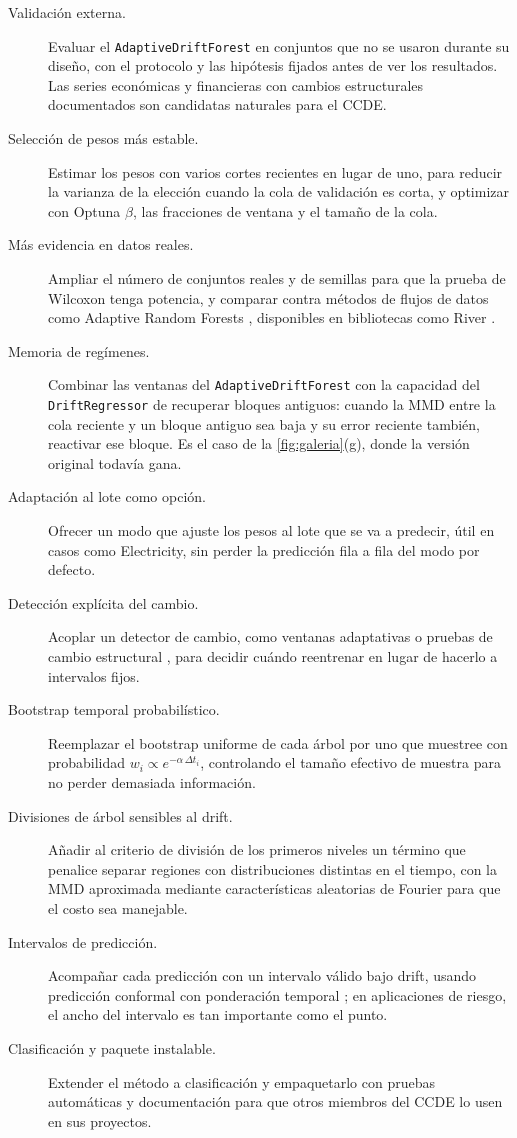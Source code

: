 \documentclass[11pt,a4paper]{article}
\begin{document}
\begin{description}
  \item[Validación externa.] Evaluar el \texttt{AdaptiveDriftForest} en conjuntos que no se usaron
  durante su diseño, con el protocolo y las hipótesis fijados antes de ver los resultados. Las series
  económicas y financieras con cambios estructurales documentados son candidatas naturales para el
  CCDE.
  \item[Selección de pesos más estable.] Estimar los pesos con varios cortes recientes en lugar de
  uno, para reducir la varianza de la elección cuando la cola de validación es corta, y optimizar con
  Optuna $\beta$, las fracciones de ventana y el tamaño de la cola.
  \item[Más evidencia en datos reales.] Ampliar el número de conjuntos reales y de semillas para que
  la prueba de Wilcoxon tenga potencia, y comparar contra métodos de flujos de datos como Adaptive
  Random Forests \parencite{gomes2017}, disponibles en bibliotecas como River
  \parencite{montiel2021}.
  \item[Memoria de regímenes.] Combinar las ventanas del \texttt{AdaptiveDriftForest} con la capacidad
  del \texttt{DriftRegressor} de recuperar bloques antiguos: cuando la MMD entre la cola reciente y un
  bloque antiguo sea baja y su error reciente también, reactivar ese bloque. Es el caso de la
  \cref{fig:galeria}(g), donde la versión original todavía gana.
  \item[Adaptación al lote como opción.] Ofrecer un modo que ajuste los pesos al lote que se va a
  predecir, útil en casos como Electricity, sin perder la predicción fila a fila del modo por
  defecto.
  \item[Detección explícita del cambio.] Acoplar un detector de cambio, como ventanas adaptativas
  \parencite{bifet2007} o pruebas de cambio estructural \parencite{baiperron1998}, para decidir
  cuándo reentrenar en lugar de hacerlo a intervalos fijos.
  \item[Bootstrap temporal probabilístico.] Reemplazar el bootstrap uniforme de cada árbol por uno
  que muestree con probabilidad $w_i \propto e^{-\alpha\,\Delta t_i}$, controlando el tamaño efectivo
  de muestra para no perder demasiada información.
  \item[Divisiones de árbol sensibles al drift.] Añadir al criterio de división de los primeros
  niveles un término que penalice separar regiones con distribuciones distintas en el tiempo, con la
  MMD aproximada mediante características aleatorias de Fourier \parencite{rahimi2007} para que el
  costo sea manejable.
  \item[Intervalos de predicción.] Acompañar cada predicción con un intervalo válido bajo drift,
  usando predicción conformal con ponderación temporal \parencite{barber2023}; en aplicaciones de
  riesgo, el ancho del intervalo es tan importante como el punto.
  \item[Clasificación y paquete instalable.] Extender el método a clasificación y empaquetarlo con
  pruebas automáticas y documentación para que otros miembros del CCDE lo usen en sus proyectos.
\end{description}
\end{document}
